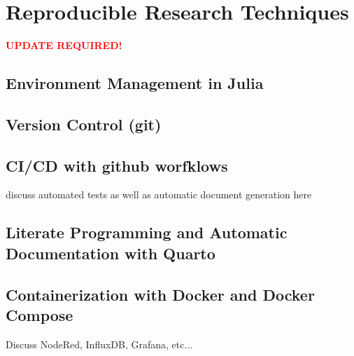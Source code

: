\chapter{Reproducible Research Techniques}
\textcolor{red}{\textbf{UPDATE REQUIRED!}}

\section{Environment Management in Julia}
\section{Version Control (git)}
\section{CI/CD with github worfklows}
discuss automated tests as well as automatic document generation here

\section{Literate Programming and Automatic Documentation with Quarto}
\section{Containerization with Docker and Docker Compose}
Discuss NodeRed, InfluxDB, Grafana, etc...

